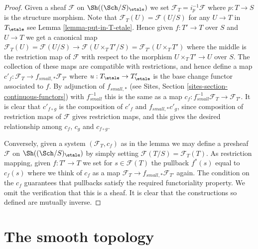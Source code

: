 \begin{proof}
Given a sheaf $\mathcal{F}$ on $\Sh((\Sch/S)_\etale)$
we set $\mathcal{F}_T = i_p^{-1}\mathcal{F}$ where $p : T \to S$
is the structure morphism. Note that
$\mathcal{F}_T(U) = \mathcal{F}(U/S)$ for any $U \to T$
in $T_\etale$ see Lemma \ref{lemma-put-in-T-etale}.
Hence given $f : T' \to T$ over $S$ and $U \to T$ we get a canonical
map $\mathcal{F}_T(U) = \mathcal{F}(U/S) \to \mathcal{F}(U \times_T T'/S)
= \mathcal{F}_{T'}(U \times_T T')$ where the middle is the restriction map
of $\mathcal{F}$ with respect to the morphism
$U \times_T T' \to U$ over $S$. The collection of these maps are
compatible with restrictions, and hence define a map
$c'_f : \mathcal{F}_T \to f_{small, *}\mathcal{F}_{T'}$ where
$u : T_\etale \to T'_\etale$ is the base change functor
associated to $f$. By adjunction of $f_{small, *}$ (see
Sites, Section \ref{sites-section-continuous-functors}) with
$f_{small}^{-1}$ this is the same as a map
$c_f : f_{small}^{-1}\mathcal{F}_T \to \mathcal{F}_{T'}$.
It is clear that $c'_{f \circ g}$ is the composition of
$c'_f$ and $f_{small, *}c'_g$, since composition of restriction maps
of $\mathcal{F}$ gives restriction maps, and this gives the desired
relationship among $c_f$, $c_g$ and $c_{f \circ g}$.

\medskip\noindent
Conversely, given a system $(\mathcal{F}_T, c_f)$ as in the lemma
we may define a presheaf $\mathcal{F}$ on
$\Sh((\Sch/S)_\etale)$
by simply setting $\mathcal{F}(T/S) = \mathcal{F}_T(T)$. As restriction
mapping, given $f : T' \to T$ we set for $s \in \mathcal{F}(T)$
the pullback $f^*(s)$ equal to $c_f(s)$ where we think of $c_f$ as
a map $\mathcal{F}_T \to f_{small, *}\mathcal{F}_{T'}$ again.
The condition on the $c_f$ guarantees that
pullbacks satisfy the required functoriality property.
We omit the verification that this is a sheaf.
It is clear that the constructions so defined are mutually inverse.
\end{proof}























\section{The smooth topology}
\label{section-smooth}

